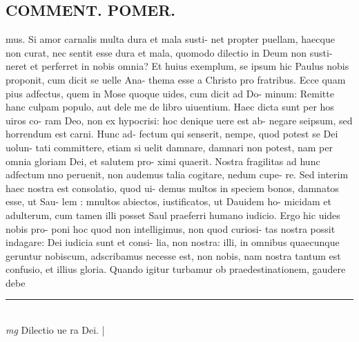 \documentclass{article}
\begin{document}
\begin{pages}
\section*{COMMENT. POMER.  }\pstart mus. Si amor carnalis multa dura et mala susti- net propter puellam, haecque non curat, nec sentit esse dura et mala, quomodo dilectio in Deum non susti- neret et perferret in nobis omnia? Et huius exemplum, se ipsum hic Paulus nobis proponit, cum dicit se uelle Ana- thema esse a Christo pro fratribus. Ecce quam pius adfectus, quem in Mose quoque uides, cum dicit ad Do- minum: Remitte hanc culpam populo, aut dele me de libro uiuentium. Haec dicta sunt per hos uiros co- ram Deo, non ex hypocrisi: hoc denique uere est ab- negare seipsum, sed horrendum est carni. Hunc ad- fectum qui senserit, nempe, quod potest se Dei uolun- tati committere, etiam si uelit damnare, damnari non potest, nam per omnia gloriam Dei, et salutem pro- ximi quaerit. Nostra fragilitas ad hunc adfectum nno peruenit, non audemus talia cogitare, nedum cupe- re. Sed interim haec nostra est consolatio, quod ui- demus multos in speciem bonos, damnatos esse, ut Sau- lem : mnultos abiectos, iustificatos, ut Dauidem ho- micidam et adulterum, cum tamen illi posset Saul praeferri humano iudicio. Ergo hic uides nobis pro- poni hoc quod non intelligimus, non quod curiosi- tas nostra possit indagare: Dei iudicia sunt et consi- lia, non nostra: illi, in omnibus quaecunque geruntur nobiscum, adscribamus necesse est, non nobis, nam nostra tantum est confusio, et illius gloria. Quando igitur turbamur ob praedestinationem, gaudere debe  \pend
\vspace{0.5cm}\noindent
\vspace{0.2cm}\rule{1cm}{0.2pt}\\ 
\hspace{0.2cm}\textit{mg}
\footnotesize Dilectio ue ra Dei. 
\normalsize| 

\end{pages}
\end{document}
